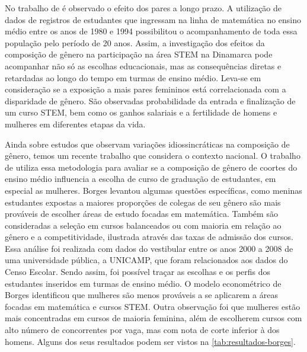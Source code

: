 No trabalho de \citet{Brene2020} é observado o efeito dos pares a longo prazo. A utilização de dados de registros de estudantes que ingressam na linha de matemática no ensino médio entre os anos de 1980 e 1994 possibilitou o acompanhamento de toda essa população pelo período de 20 anos. Assim, a investigação dos efeitos da composição de gênero na participação na área STEM na Dinamarca pode acompanhar não só as escolhas educacionais, mas as consequências diretas e retardadas ao longo do tempo em turmas de ensino médio. Leva-se em consideração se a exposição a mais pares femininos está correlacionada com a disparidade de gênero. São observadas probabilidade da entrada e finalização de um curso STEM, bem como os ganhos salariais e a fertilidade de homens e mulheres em diferentes etapas da vida.

Ainda sobre estudos que observam variações idiossincráticas na composição de gênero, temos um recente trabalho que considera o contexto nacional. O trabalho de \citet{Borges2021} utiliza essa metodologia para avaliar se a composição de gênero de coortes do ensino médio influencia a escolha de curso de graduação de estudantes, em especial as mulheres. Borges levantou algumas questões específicas, como meninas estudantes expostas a maiores proporções de colegas de seu gênero são mais prováveis de escolher áreas de estudo focadas em matemática. Também são consideradas a seleção em cursos balanceados ou com maioria em relação ao gênero e a competitividade, ilustrada através das taxas de admissão dos cursos. Essa análise foi realizada com dados do vestibular entre os anos 2000 a 2008 de uma universidade pública, a UNICAMP, que foram relacionados aos dados do Censo Escolar. Sendo assim, foi possível traçar as escolhas e os perfis dos estudantes inseridos em turmas de ensino médio. O modelo econométrico de Borges identificou que mulheres são menos prováveis a se aplicarem a áreas focadas em matemática e cursos STEM. Outra observação foi que mulheres estão mais concentradas em cursos de maioria feminina, além de escolherem cursos com alto número de concorrentes por vaga, mas com nota de corte inferior à dos homens. Alguns dos seus resultados podem ser vistos na \autoref{tab:resultados-borges}.

